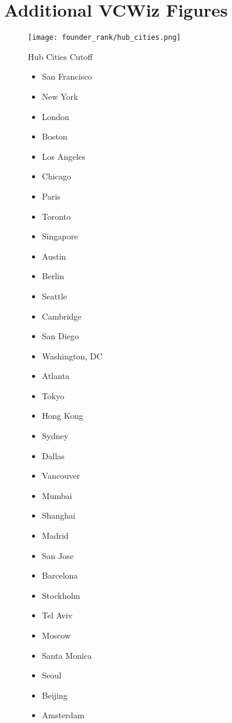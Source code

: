 \chapter{Additional VCWiz Figures}

\begin{figure}[ht]
  \texttt{[image: founder\_rank/hub\_cities.png]}
  \caption{Hub Cities Cutoff}
  \label{vcwiz:fig:hubscuttof}
  \centering
\end{figure}

\begin{figure}[ht]
\begin{multicols}{2}
  \begin{itemize}
    \item San Francisco
    \item New York
    \item London
    \item Boston
    \item Los Angeles
    \item Chicago
    \item Paris
    \item Toronto
    \item Singapore
    \item Austin
    \item Berlin
    \item Seattle
    \item Cambridge
    \item San Diego
    \item Washington, DC
    \item Atlanta
    \item Tokyo
    \item Hong Kong
    \item Sydney
    \item Dallas
    \item Vancouver
    \item Mumbai
    \item Shanghai
    \item Madrid
    \item San Jose
    \item Barcelona
    \item Stockholm
    \item Tel Aviv
    \item Moscow
    \item Santa Monica
    \item Seoul
    \item Beijing
    \item Amsterdam

\end{itemize}
\end{multicols}
\end{figure}
